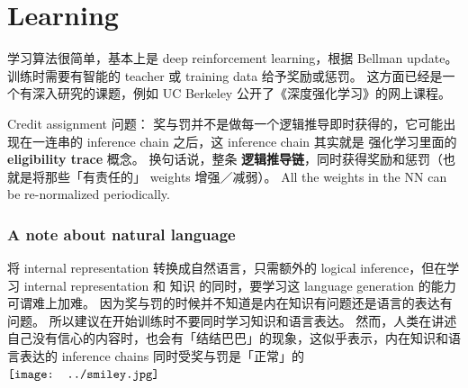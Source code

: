 \documentclass[orivec]{article}
\newcommand{\cc}[2]{#1}
\newcommand{\cc}[2]{#2}
\newcommand*\smiley{\vcenter{\hbox{\texttt{[image: ../smiley.jpg]}}}}
\begin{document}
\section{Learning}

\cc{
学习算法很简单，基本上是 deep reinforcement learning，根据 Bellman update。 训练时需要有智能的 teacher 或 training data 给予奖励或惩罚。  这方面已经是一个有深入研究的课题，例如 UC Berkeley 公开了《深度强化学习》的网上课程。}{
Learning is simply the application of \textbf{deep reinforcement learning}, via the \textbf{Bellman update}.  Training requires rewards and punishment information from a teacher or training data set.  This is a well-researched topic, for example there is an online course on DRL from UC Berkeley.
}

\cc{
Credit assignment 问题：  奖与罚并不是做每一个逻辑推导即时获得的，它可能出现在一连串的 inference chain 之后，这 inference chain 其实就是 强化学习里面的 \textbf{eligibility trace} 概念。  换句话说，整条 \textbf{逻辑推导链}，同时获得奖励和惩罚（也就是将那些「有责任的」 weights 增强／减弱）。  All the weights in the NN can be re-normalized periodically.}{
The \textbf{credit assignment} problem:  rewards and punishment is not instantly received after a single inference step, but may appear after a long \textbf{inference chain}.  This inference chain plays the same role as the \textbf{eligibility trace} in reinforcement learning.  In other words, the entire chain needs to be rewarded or punished during learning (in other words, increase or decrease the weights that were \textbf{responsible} in the inference chain).  All the weights in the NN can be re-normalized periodically.
}

\subsubsection{A note about natural language}

\cc{
将 internal representation 转换成自然语言，只需额外的 logical inference，但在学习 internal representation 和 知识 的同时，要学习这 language generation 的能力可谓难上加难。  因为奖与罚的时候并不知道是内在知识有问题还是语言的表达有问题。 所以建议在开始训练时不要同时学习知识和语言表达。  然而，人类在讲述自己没有信心的内容时，也会有「结结巴巴」的现象，这似乎表示，内在知识和语言表达的 inference chains 同时受奖与罚是「正常」的 $\smiley$}{
To generate natural language from internal representations, we only need additional logical inference.  However, to learn language generation while learning the internal representation and knowledge at the same time might be too difficult, so we would advice against trying these as first experiments.  However, even for humans, talking about things that one is not confident about, often results in stammering and other speech disturbances.  This may be evidence that rewarding / punishing the inference chains for language and for real knowledge at the same time, may be ``normal'' $\smiley$
}
\end{document}
